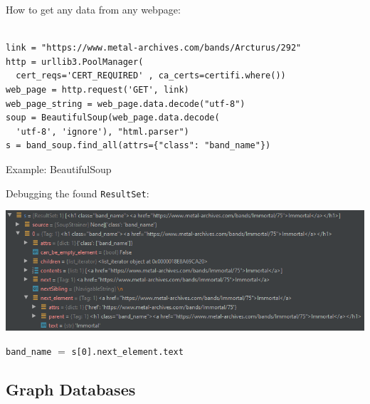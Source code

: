 \documentclass{beamer}
\begin{document}
    \begin{frame}[fragile]

How to get any data from any webpage:

\begin{lstlisting}[basicstyle=\footnotesize,]

link = "https://www.metal-archives.com/bands/Arcturus/292"
http = urllib3.PoolManager(
  cert_reqs='CERT_REQUIRED' , ca_certs=certifi.where())
web_page = http.request('GET', link)
web_page_string = web_page.data.decode("utf-8")
soup = BeautifulSoup(web_page.data.decode(
  'utf-8', 'ignore'), "html.parser")
s = band_soup.find_all(attrs={"class": "band_name"})

\end{lstlisting}

    \end{frame}

    \begin{frame}{Example: BeautifulSoup}

      Debugging the found \texttt{ResultSet}:

      \begin{center}
        \includegraphics[scale=1.6]{debug_01}
      \end{center}
      
      \texttt{band\_name} $=$ \texttt{s[0].next\_element.text}
    \end{frame}

  \subsection{Graph Databases}
\end{document}
